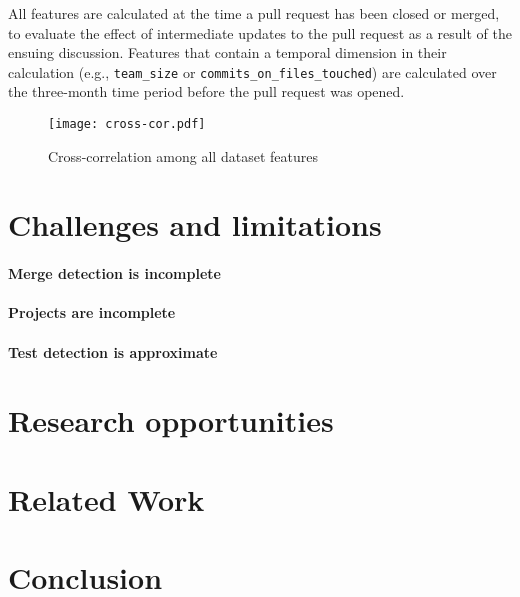 \documentclass{sig-alternate}
\begin{document}
All features are calculated at the time a pull request has been closed or
merged, to evaluate the effect of intermediate updates to the pull request as a
result of the ensuing discussion. Features that contain a temporal dimension in
their calculation (e.g., \texttt{team\_size} or
\texttt{commits\_on\_files\_touched}) are calculated over the three-month time
period before the pull request was opened.

\begin{figure}
  \begin{center}
    \texttt{[image: cross-cor.pdf]}
  \end{center}
  \caption{Cross-correlation among all dataset features}
  \label{fig:wordcloud}
\end{figure}



\section{Challenges and limitations}
\label{sec:challenges}

\paragraph*{Merge detection is incomplete}

\paragraph*{Projects are incomplete}

\paragraph*{Test detection is approximate}


\section{Research opportunities}
\label{sec:discussion}

\section{Related Work}
\label{sec:rel}


\section{Conclusion}




\balance

  
\end{document}
